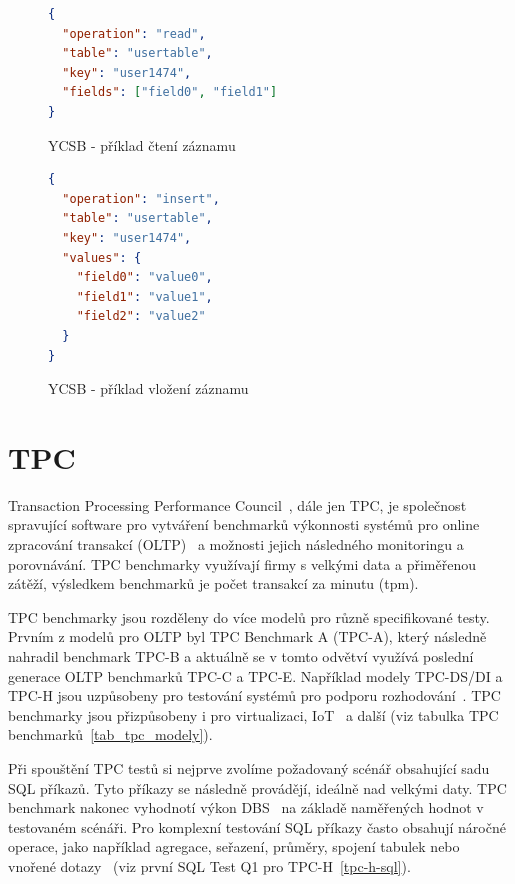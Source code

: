 \documentclass[czech,master,dept460,male,csharp,cpdeclaration]{diploma}
\begin{document}
	\begin{figure}[H]
	\centering
	\begin{lstlisting}[language=json,firstnumber=1]
{
  "operation": "read",
  "table": "usertable",
  "key": "user1474",
  "fields": ["field0", "field1"]
}
	\end{lstlisting}
	\caption{YCSB - příklad čtení záznamu}
	\label{json-ycsb-operace-read}
	\end{figure}	
	
	\begin{figure}[H]
		\centering
		\begin{lstlisting}[language=json,firstnumber=1]
{
  "operation": "insert",
  "table": "usertable",
  "key": "user1474",
  "values": {
    "field0": "value0",
    "field1": "value1",
    "field2": "value2"
  }
}
		\end{lstlisting}
		\caption{YCSB - příklad vložení záznamu}
		\label{json-ycsb-operace-insert}
	\end{figure}	
	
	\section{TPC}
	
	Transaction Processing Performance Council~\cite{tpc}, dále jen TPC, je společnost spravující software pro vytváření benchmarků výkonnosti systémů pro online zpracování transakcí (OLTP)~\cite{oltp} a možnosti jejich následného monitoringu a porovnávání. TPC benchmarky využívají firmy s velkými data a přiměřenou zátěží, výsledkem benchmarků je počet transakcí za minutu (tpm).
	
	TPC benchmarky jsou rozděleny do více modelů pro různě specifikované testy. Prvním z modelů pro OLTP byl TPC Benchmark A (TPC-A), který následně nahradil benchmark TPC-B a aktuálně se v tomto odvětví využívá poslední generace OLTP benchmarků TPC-C a TPC-E. Například modely TPC-DS/DI a TPC-H jsou uzpůsobeny pro testování systémů pro podporu rozhodování~\cite{dss}. TPC benchmarky jsou přizpůsobeny i pro virtualizaci, IoT~\cite{iot} a další (viz tabulka TPC benchmarků~\ref{tab_tpc_modely}).
	
	Při spouštění TPC testů si nejprve zvolíme požadovaný scénář obsahující sadu SQL příkazů. Tyto příkazy se následně provádějí, ideálně nad velkými daty. TPC benchmark nakonec vyhodnotí výkon DBS~\cite{tpc-ytb-benchmark} na základě naměřených hodnot v testovaném scénáři. Pro komplexní testování SQL příkazy často obsahují náročné operace, jako například agregace, seřazení, průměry, spojení tabulek nebo vnořené dotazy~\cite{tpc-h-sql, tpc-h-index} (viz první SQL Test Q1 pro TPC-H~\ref{tpc-h-sql}).
	
\end{document}
